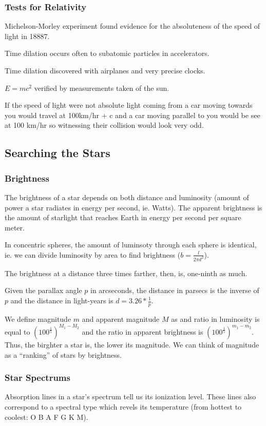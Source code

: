 \documentclass[12pt]{article}
\begin{document}
\subsubsection{Tests for Relativity}
Michelson-Morley experiment found evidence for the absoluteness of the speed of light in 18887.

Time dilation occurs often to subatomic particles in accelerators.

Time dilation discovered with airplanes and very precise clocks.

$E = mc^2$ verified by measurements taken of the sun.

If the speed of light were not absolute light coming from a car moving towards you would travel at 100km/hr + c and a car moving parallel to you would be see at 100 km/hr so witnessing their collision would look very odd.

\subsection{Searching the Stars}
\subsubsection{Brightness}
The brightness of a star depends on both distance and luminosity (amount of power a star radiates in energy per second, ie. Watts). The apparent brightness is the amount of starlight that reaches Earth in energy per second per square meter.

In concentric spheres, the amount of luminsoty through each sphere is identical, ie. we can divide luminosity by area to find brightness ($b = \frac{l}{2\pi d^2}$).

The brightness at a distance three times farther, then, is, one-ninth as much.

Given the parallax angle $p$ in arcseconds, the distance in parsecs is the inverse of $p$ and the distance in light-years is $d = 3.26 * \frac{1}{p}$.

We define magnitude $m$ and apparent magnitude $M$ as and ratio in luminosity is equal to $(100^\frac{1}{5})^{M_1 - M_2}$ and the ratio in apparent brightness is $(100^\frac{1}{5})^{m_1 - m_2}$. Thus, the birghter a star is, the lower its magnitude. We can think of magnitude as a ``ranking'' of stars by brightness.

\subsubsection{Star Spectrums}
Absorption lines in a star's spectrum tell us its ionization level. These lines also correspond to a spectral type which revels its temperature (from hottest to coolest: O B A F G K M).
\end{document}
